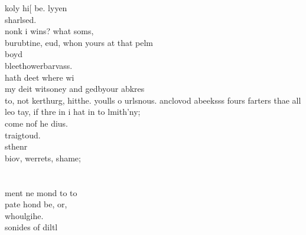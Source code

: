     koly hi[ be. lyyen \\
    sharlsed. \\
    nonk i wins? what soms, \\
    burubtine, eud, whon yours at that pelm \\
    boyd \\
    bleethowerbarvass. \\
    hath deet where wi \\
    my deit witsoney and gedbyour abkres \\
    to, not kerthurg, hitthe. youlls o urlsnous. anclovod abeeksss fours farters thae all leo tay, if thre in i hat in to lmith'ny; \\
    come nof he dius. \\
    traigtoud. \\
    sthenr \\
    biov, werrets, shame; \\
 \\
 \\
   ment ne mond to to \\
    pate hond be, or, \\
    whoulgihe. \\
    sonides of diltl \\

